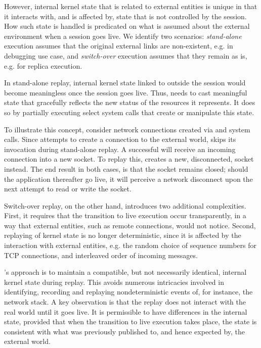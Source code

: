 However, internal kernel state that is related to external entities is
unique in that it interacts with, and is affected by, state that is
not controlled by the session. How such state is handled is predicated
on what is assumed about the external environment when a session goes
live. We identify two scenarios: {\em stand-alone} execution assumes
that the original external links are non-existent, e.g. in debugging
use case, and {\em switch-over} execution assumes that they remain 
as is, e.g. for replica execution.

In stand-alone replay, internal kernel state linked to outside the
session would become meaningless once the session goes live. Thus,
\scribe{} needs to cast meaningful state that gracefully reflects the
new status of the resources it represents. It does so by partially
executing select system calls that create or manipulate this state.

To illustrate this concept, consider network connections created via
 and  system calls. Since 
attempts to create a connection to the external world, \scribe{} skips
its invocation during stand-alone replay. A successful 
will receive an incoming connection into a new socket. To replay
this, \scribe{} creates a new, disconnected, socket instead. The end
result in both cases, is that the socket remains closed; should the
application thereafter go live, it will perceive a network disconnect
upon the next attempt to read or write the socket.
  
  

Switch-over replay, on the other hand, introduces two additional
complexities. First, it requires that the transition to live execution
occur transparently, in a way that external entities, such as remote
connections, would not notice. Second, replaying of kernel state is
no longer deterministic, since it is affected by the interaction with
external entities, e.g. the random choice of sequence numbers for TCP
connections, and interleaved order of incoming messages.

\scribe{}'s approach is to maintain a compatible, but not necessarily
identical, internal kernel state during replay. This avoids
numerous intricacies involved in identifying, recording and replaying
nondeterministic events of, for instance, the network stack. A key
observation is that the replay does not interact with the real world
until it goes live. It is permissible to have differences
in the internal state, provided that when the transition to live
execution takes place, the state is consistent with what was previously
published to, and hence expected by, the external world.


